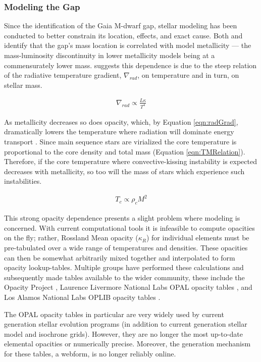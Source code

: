 \subsubsection{Modeling the Gap}
Since the identification of the Gaia M-dwarf gap, stellar modeling has been
conducted to better constrain its location, effects, and exact cause.
Both \citet{Mansfield2021} and \citet{Feiden2021} identify that the gap's mass
location is correlated with model metallicity --- the mass-luminosity
discontinuity in lower metallicity models being at a commensurately lower mass.
\citet{Feiden2021} suggests this dependence is due to the steep relation of
the radiative temperature gradient, $\nabla_{rad}$, on temperature and in turn,
on stellar mass.

\begin{align}\label{eqn:radGrad}
	\nabla_{rad} \propto \frac{L\kappa}{T^{4}}
\end{align}

As metallicity decreases so does opacity, which, by Equation \ref{eqn:radGrad},
dramatically lowers the temperature where radiation will dominate energy transport
\citep{Chabrier1997}. Since main sequence stars are virialized the core
temperature is proportional to the core density and total mass (Equation
\ref{eqn:TMRelation}). Therefore, if the core temperature where
convective-kissing instability is expected decreases with metallicity, so too
will the mass of stars which experience such instabilities.

\begin{align}\label{eqn:TMRelation}
	T_{c} \propto \rho_{c}M^{2}
\end{align}

This strong opacity dependence presents a slight problem where modeling is 
concerned. With current computational tools it is infeasible to compute opacities on the
fly; rather, Rossland Mean opacity ($\kappa_{R}$) for individual elements must
be pre-tabulated over a wide range of temperatures and densities. These
opacities can then be somewhat arbitrarily mixed together and interpolated to
form opacity lookup-tables. Multiple groups have performed these calculations
and subsequently made tables available to the wider community, these include
the Opacity Project \citep[OP][]{Seaton1994}, Laurence Livermore National Labs
OPAL opacity tables \citep{Iglesias1996}, and Los Alamos National Labs OPLIB
opacity tables \citep{Colgan2016}.

The OPAL opacity tables in particular are very widely used by current
generation stellar evolution programs (in addition to current generation
stellar model and isochrone grids). However, they are no longer the most
up-to-date elemental opacities or numerically precise. Moreover, the generation
mechanism for these tables, a webform, is no longer reliably online.  

